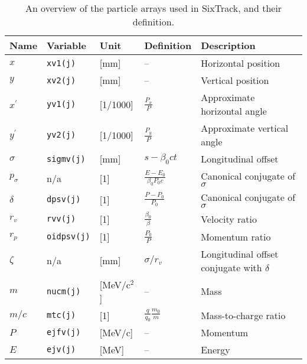\begin{center}
\begin{longtabu}{@{}llllp{7cm}}
  \caption{An overview of the particle arrays used in SixTrack, and their definition.}
  \label{Table:TrackArray} \\*
  \textbf{Name} & \textbf{Variable} & \textbf{Unit} & \textbf{Definition} & \textbf{Description} \\
  \hline
  $x$        & \texttt{xv1(j)}    & [mm]         & --                            & Horizontal position \\
  $y$        & \texttt{xv2(j)}    & [mm]         & --                            & Vertical position \\
  $x^\prime$ & \texttt{yv1(j)}    & [1/1000]     & $\frac{P_x}{P}$               & Approximate horizontal angle \\
  $y^\prime$ & \texttt{yv2(j)}    & [1/1000]     & $\frac{P_y}{P}$               & Approximate vertical angle \\
  $\sigma$   & \texttt{sigmv(j)}  & [mm]         & $s-\beta_0 c t$               & Longitudinal offset \\
  $p_\sigma$ & n/a                & [1]          & $\frac{E-E_0}{\beta_0 P_0 c}$ & Canonical conjugate of $\sigma$ \\
  $\delta$   & \texttt{dpsv(j)}   & [1]          & $\frac{P-P_0}{P_0}$           & Canonical conjugate of $\sigma$ \\
  $r_v$      & \texttt{rvv(j)}    & [1]          & $\frac{\beta_0}{\beta}$       & Velocity ratio \\
  $r_p$      & \texttt{oidpsv(j)} & [1]          & $\frac{P_0}{P}$               & Momentum ratio \\
  $\zeta$    & n/a                & [mm]         & $\sigma/r_v$                  & Longitudinal offset conjugate with $\delta$ \\
  $m$        & \texttt{nucm(j)}   & [MeV/c$^2$]  & --                            & Mass \\
  $m/c$      & \texttt{mtc(j)}    & [1]          & $\frac{q}{q_0} \frac{m_0}{m}$ & Mass-to-charge ratio \\
  $P$        & \texttt{ejfv(j)}   & [MeV/c]      & --                            & Momentum \\
  $E$        & \texttt{ejv(j)}    & [MeV]        & --                            & Energy \\
\end{longtabu}
\end{center}

